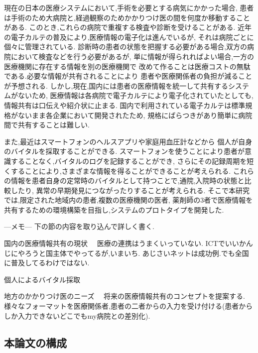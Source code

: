 現在の日本の医療システムにおいて,手術を必要とする病気にかかった場合,
患者は手術のため大病院と,経過観察のためかかりつけ医の間を何度か移動することがある.
このとき,これらの病院で重複する検査や診断を受けることがある.
近年の電子カルテの普及により,医療情報の電子化は進んでいるが,
それは病院ごとに個々に管理されている.
診断時の患者の状態を把握する必要がある場合,双方の病院において検査などを行う必要があるが,
単に情報が得られればよい場合,一方の医療機関に存在する情報を別の医療機関で
改めて作ることは医療コストの無駄である.必要な情報が共有されることにより
患者や医療関係者の負担が減ることが予想される.
しかし,現在,国内には患者の医療情報を統一して共有するシステムがないため,
医療情報は各病院で電子カルテにより電子化されていたとしても,
情報共有は口伝えや紹介状に止まる.
国内で利用されている電子カルテは標準規格がないまま各企業において開発されたため,
規格にばらつきがあり簡単に病院間で共有することは難しい.

また,最近はスマートフォンのヘルスアプリや家庭用血圧計などから
個人が自身のバイタルを採取することができる.
スマートフォンを使うことにより患者が意識することなく,バイタルのログを記録することができ,
さらにその記録周期を短くすることにより,さまざまな情報を得ることができることが考えられる.
これらの情報を患者自身の定常時のバイタルとして持つことで,通院,入院時の状態と比較したり,
異常の早期発見につながったりすることが考えられる.
そこで本研究では,限定された地域内の患者,複数の医療機関の医者,
薬剤師の3者で医療情報を共有するための環境構築を目指し,システムのプロトタイプを開発した.

---メモ---
  下の節の内容を取り込んで詳しく書く.

国内の医療情報共有の現状
　医療の連携はうまくいっていない.
  ICTでいいかんじにやろうと国主体でやってるが,いまいち.
  あじさいネットは成功例.でも全国に普及してるわけではない.\cite{bibi3}

個人によるバイタル採取

地方のかかりつけ医のニーズ
　将来の医療情報共有のコンセプトを提案する.
  様々なフォーマットを医療関係者,患者の二者からの入力を受け付ける(患者からしか入力できないどこでもmy病院との差別化).

\subsection{本論文の構成}
